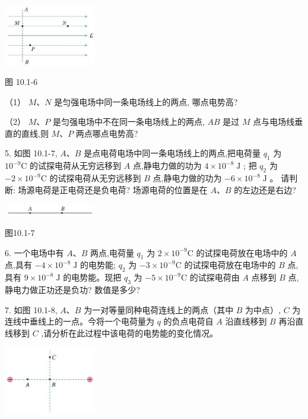 \documentclass[10pt]{article}
\begin{document}
\begin{center}
\includegraphics[max width=0.3\textwidth]{images/01911d5f-8e38-70c0-b5b8-2b399bd115b6_35_548156.jpg}
\end{center}

图 10.1-6

（1） \(M\text{、}N\) 是匀强电场中同一条电场线上的两点, 哪点电势高?

（2） \(M\text{、}P\) 是匀强电场中不在同一条电场线上的两点, \({AB}\) 是过 \(M\) 点与电场线垂直的直线,则 \(M\text{、}P\) 两点哪点电势高?

5. 如图 10.1-7, \(A\text{、}B\) 是点电荷电场中同一条电场线上的两点,把电荷量 \({q}_{1}\) 为 \({10}^{-9}\mathrm{C}\) 的试探电荷从无穷远移到 \(A\) 点,静电力做的功为 \(4 \times {10}^{-8}\mathrm{\;J}\) ; 把 \({q}_{2}\) 为 \(- 2 \times {10}^{-9}\mathrm{C}\) 的试探电荷从无穷远移到 \(B\) 点,静电力做的功为 \(- 6 \times {10}^{-8}\mathrm{\;J}\) 。 请判断: 场源电荷是正电荷还是负电荷? 场源电荷的位置是在 \(A\text{、}B\) 的左边还是右边?

\begin{center}
\includegraphics[max width=0.3\textwidth]{images/01911d5f-8e38-70c0-b5b8-2b399bd115b6_35_344805.jpg}
\end{center}

图10.1-7

6. 一个电场中有 \(A\text{、}B\) 两点,电荷量 \({q}_{1}\) 为 \(2 \times {10}^{-9}\mathrm{C}\) 的试探电荷放在电场中的 \(A\) 点,具有 \(- 4 \times {10}^{-8}\mathrm{\;J}\) 的电势能; \({q}_{2}\) 为 \(- 3 \times {10}^{-9}\mathrm{C}\) 的试探电荷放在电场中的 \(B\) 点,具有 \(9 \times {10}^{-8}\mathrm{\;J}\) 的电势能。现把 \({q}_{3}\) 为 \(- 5 \times {10}^{-9}\mathrm{C}\) 的试探电荷由 \(A\) 点移到 \(B\) 点,静电力做正功还是负功? 数值是多少?

7. 如图 10.1-8, \(A\text{、}B\) 为一对等量同种电荷连线上的两点（其中 \(B\) 为中点）, \(C\) 为连线中垂线上的一点。今将一个电荷量为 \(q\) 的负点电荷自 \(A\) 沿直线移到 \(B\) 再沿直线移到 \(C\) ,请分析在此过程中该电荷的电势能的变化情况。

\begin{center}
\includegraphics[max width=0.3\textwidth]{images/01911d5f-8e38-70c0-b5b8-2b399bd115b6_35_983737.jpg}
\end{center}
\end{document}
